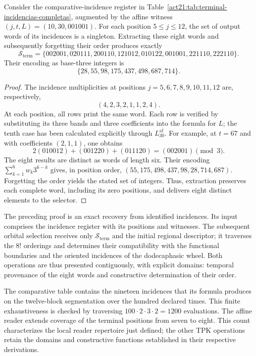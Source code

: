 \begin{proposition}
\label{act21:prop:repertorio-terminal-ocho-incidencias}
Consider the comparative-incidence register in
Table~\ref{act21:tab:terminal-incidencias-completas}, augmented by the affine
witness $(j,t,L)=(10,30,001001)$. For each position $5\leq j\leq12$, the
set of output words of its incidences is a singleton.
Extracting these eight words and subsequently forgetting their order
produces exactly
\[
 \mathcal S_{\mathrm{term}}=
 \{002001,020111,200110,121012,010122,001001,221110,222110\}.
\]
Their encoding as base-three integers is
\[
 \{28,55,98,175,437,498,687,714\}.
\]
\end{proposition}
\begin{proof}
The incidence multiplicities at positions $j=5,6,7,8,9,10,11,12$
are, respectively,
\[
 (4,2,3,2,1,1,2,4).
\]
At each position, all rows print the same word. Each row
is verified by substituting its three bands and three coefficients into the
formula for $L$; the tenth case has been calculated explicitly through
$L^{\mathrm{af}}_{30}$. For example, at $t=67$ and with coefficients
$(2,1,1)$, one obtains
\[
 2(010012)+(001220)+(011120)=(002001)\pmod3.
\]
The eight results are distinct as words of length six. Their
encoding $\sum_{k=1}^{6}w_k3^{6-k}$ gives, in position
order, $(55,175,498,437,98,28,714,687)$. Forgetting the order
yields the stated set of integers. Thus, extraction preserves
each complete word, including its zero positions, and delivers eight
distinct elements to the selector.
\end{proof}

The preceding proof is an exact recovery from identified
incidences. Its input comprises the incidence register
with its positions and witnesses. The subsequent orbital selection receives
only $\mathcal S_{\mathrm{term}}$ and the initial regional descriptor;
it traverses the $8!$ orderings and determines their compatibility with the
functional boundaries and the oriented incidences of the dodecaphasic
wheel. Both operations are thus presented contiguously, with explicit
domains: temporal provenance of the eight words and constructive
determination of their order.

The comparative table contains the nineteen incidences that its formula
produces on the twelve-block segmentation over the hundred declared
times. This finite exhaustiveness is checked by traversing
$100\cdot2\cdot3\cdot2=1200$ evaluations. The affine reader extends
coverage of the terminal positions from seven to eight. This count
characterizes the local reader repertoire just defined;
the other TPK operations retain the domains and constructive functions
established in their respective derivations.

